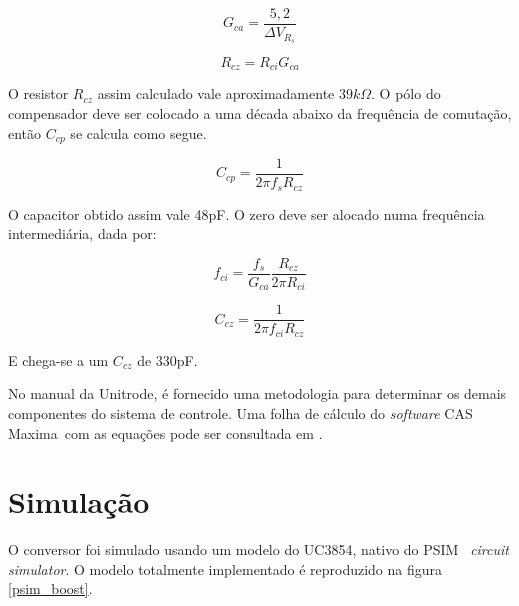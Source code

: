 \documentclass[
        12pt,
        openany, %
        oneside, %
        a4paper,			
        english,			
        brazil
        ]{abntbibufjf}
\begin{document}
\begin{equation}
G_{ca}=\frac{5,2}{\Delta V_{R_s}}
\end{equation}

\begin{equation}
R_{cz}=R_{ci}G_{ca}
\end{equation}

O resistor $R_{cz}$ assim calculado vale aproximadamente $39k\Omega$. O pólo do compensador deve ser colocado a uma década abaixo da frequência de comutação, então $C_{cp}$ se calcula como segue.

\begin{equation}
C_{cp}=\frac{1}{2\pi f_s R_{cz}}
\end{equation}

O capacitor obtido assim vale 48pF. O zero deve ser alocado numa frequência intermediária, dada por:

\begin{equation}
f_{ci}=\frac{f_s}{G_{ca}}\frac{R_{cz}}{2\pi R_{ci}}
\end{equation}

\begin{equation}
C_{cz}=\frac{1}{2\pi f_{ci} R_{cz}}
\end{equation}

E chega-se a um $C_{cz}$ de 330pF.


No manual da Unitrode, é fornecido uma metodologia para determinar os demais componentes do sistema de controle. Uma folha de cálculo do \textit{software} CAS Maxima\textregistered ~com as equações pode ser consultada em \cite{github}.








\section{Simulação}

O conversor foi simulado usando um modelo do UC3854, nativo do PSIM\textregistered ~ \textit{circuit simulator}. O modelo totalmente implementado é reproduzido na figura \ref{psim_boost}.
\end{document}

